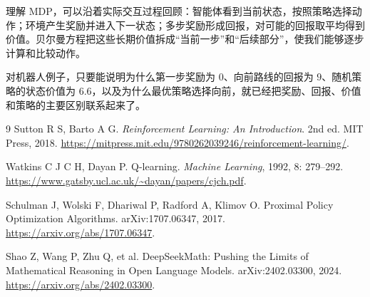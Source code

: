 \documentclass[UTF8]{ctexart}
\begin{document}
理解 MDP，可以沿着实际交互过程回顾：智能体看到当前状态，按照策略选择动作；环境产生奖励并进入下一状态；多步奖励形成回报，对可能的回报取平均得到价值。贝尔曼方程把这些长期价值拆成“当前一步”和“后续部分”，使我们能够逐步计算和比较动作。

对机器人例子，只要能说明为什么第一步奖励为 $0$、向前路线的回报为 $9$、随机策略的状态价值为 $6.6$，以及为什么最优策略选择向前，就已经把奖励、回报、价值和策略的主要区别联系起来了。

\begin{thebibliography}{9}
  Sutton R S, Barto A G.
  \emph{Reinforcement Learning: An Introduction}.
  2nd ed. MIT Press, 2018.
  \url{https://mitpress.mit.edu/9780262039246/reinforcement-learning/}.

  Watkins C J C H, Dayan P.
  Q-learning.
  \emph{Machine Learning}, 1992, 8: 279--292.
  \url{https://www.gatsby.ucl.ac.uk/~dayan/papers/cjch.pdf}.

  Schulman J, Wolski F, Dhariwal P, Radford A, Klimov O.
  Proximal Policy Optimization Algorithms.
  arXiv:1707.06347, 2017.
  \url{https://arxiv.org/abs/1707.06347}.

  Shao Z, Wang P, Zhu Q, et al.
  DeepSeekMath: Pushing the Limits of Mathematical Reasoning in Open Language Models.
  arXiv:2402.03300, 2024.
  \url{https://arxiv.org/abs/2402.03300}.
\end{thebibliography}
\end{document}
